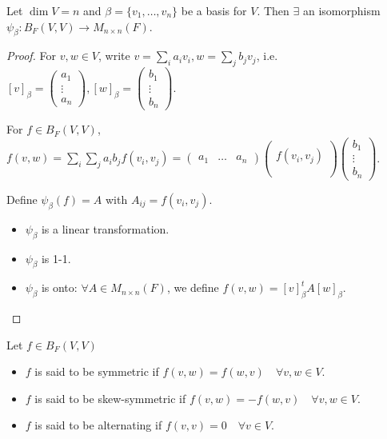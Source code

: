 \begin{theorem}
  Let $\dim V = n$ and $\beta = \{ v_1, \dots, v_n \}$ be a basis for $V$.
  Then $\exists$ an isomorphism $\psi_\beta: B_F(V, V) \to M_{n\times n}(F)$.
  \begin{proof}
    For $v, w \in V$, write $v = \sum_i a_iv_i, w = \sum_j b_j v_j$, i.e.
    $[v]_\beta = \begin{pmatrix}a_1\\ \vdots \\ a_n\end{pmatrix},
    [w]_\beta = \begin{pmatrix}b_1\\ \vdots \\ b_n\end{pmatrix}$.

    For $f \in B_F(V, V)$, $f(v, w) = \sum_i \sum_j a_ib_j f(v_i, v_j)
    = \begin{pmatrix}a_1 & \dots & a_n\end{pmatrix}
    \begin{pmatrix} \\ f(v_i, v_j) \\ \\ \end{pmatrix}
    \begin{pmatrix}b_1 \\ \vdots \\ b_n\end{pmatrix}$.

    Define $\psi_\beta(f) = A$ with $A_{ij} = f(v_i, v_j)$.
    \begin{itemize}
      \item $\psi_\beta$ is a linear transformation.
      \item $\psi_\beta$ is 1-1.
      \item $\psi_\beta$ is onto: $\forall A \in M_{n\times n}(F)$, we define
        $f(v, w) = [v]_\beta^t A [w]_\beta$.
    \end{itemize}
  \end{proof}
\end{theorem}

\begin{definition}
  Let $f \in B_F(V, V)$
  \begin{itemize}
    \item $f$ is said to be symmetric if
      $f(v, w) = f(w, v) \quad \forall v, w \in V$.
    \item $f$ is said to be skew-symmetric if
      $f(v, w) = -f(w, v) \quad \forall v, w \in V$.
    \item $f$ is said to be alternating if $f(v, v) = 0 \quad \forall v \in V$.
  \end{itemize}
\end{definition}

